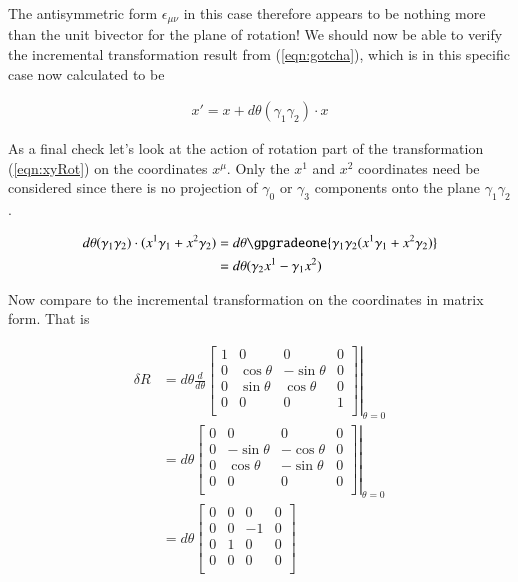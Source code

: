 The antisymmetric form $\epsilon_{\mu\nu}$ in this case therefore appears to be nothing more than the unit bivector for the plane of rotation!  We should now be able to verify the incremental transformation result from (\ref{eqn:gotcha}), which is in this specific case now calculated to be

\begin{align}\label{eqn:xyRot}
x'= x + d\theta (\gamma_1 \gamma_2) \cdot x
\end{align}

As a final check let's look at the action of rotation part of the transformation (\ref{eqn:xyRot}) on the coordinates $x^\mu$.  Only the $x^1$ and $x^2$ coordinates need be considered since there is no projection of $\gamma_0$ or $\gamma_3$ components onto the plane $\gamma_1 \gamma_2$.

\begin{align*}
d\theta (\gamma_1 \gamma_2) \cdot (x^1 \gamma_1 + x^2 \gamma_2)
&= 
d\theta \gpgradeone{ \gamma_1 \gamma_2 (x^1 \gamma_1 + x^2 \gamma_2) } \\
&= 
d\theta (\gamma_2 x^1 - \gamma_1 x^2)  \\
\end{align*}

Now compare to the incremental transformation on the coordinates in matrix form.  That is

\begin{align*}
\delta R
&=
d\theta \frac{d}{d\theta}
{
\left.
\begin{bmatrix}
1 & 0 & 0 & 0 \\
0 & \cos\theta & -\sin\theta & 0 \\
0 & \sin\theta & \cos\theta & 0 \\
0 & 0 & 0 & 1 \\
\end{bmatrix}
\right\vert}_{\theta=0} \\
&=
d\theta
{
\left.
\begin{bmatrix}
0 & 0 & 0 & 0 \\
0 & -\sin\theta & -\cos\theta & 0 \\
0 & \cos\theta & -\sin\theta & 0 \\
0 & 0 & 0 & 0 \\
\end{bmatrix}
\right\vert}_{\theta=0} \\
&=
d\theta
\begin{bmatrix}
0 & 0 & 0 & 0 \\
0 & 0 & -1 & 0 \\
0 & 1 & 0 & 0 \\
0 & 0 & 0 & 0 \\
\end{bmatrix} \\
\end{align*}

